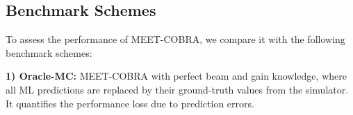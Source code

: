 \documentclass[conference, a4paper]{IEEEtran}
\newif\ifshowdeletions
\newcommand{\currentdel}[1]{\ifshowdeletions\textcolor{deletioncolor}{\sout{#1}}\fi}
\theoremstyle{remark}
\begin{document}
\subsection{Benchmark Schemes}
\label{subsec:benchmarks}

To assess the performance of MEET-COBRA, we compare it with the following benchmark schemes:


\textbf{1) Oracle-MC:} MEET-COBRA with perfect beam and gain knowledge, where all ML predictions are replaced by their ground-truth values from the simulator. It quantifies the performance loss due to prediction errors.

\currentdel{\textbf{2) Oracle-CR-LB:} A non-implementable power lower bound obtained by solving the continuous relaxation of \textbf{P2} (i.e., relaxing $u^{[x+1]}_{m,v}\in\{0,1\}$ to $[0,1]$) with perfect beam and gain knowledge. If the relaxed problem is infeasible, the full-load power ceiling is reported. No latency metric is reported for this unrealistic scheme.}
\end{document}
